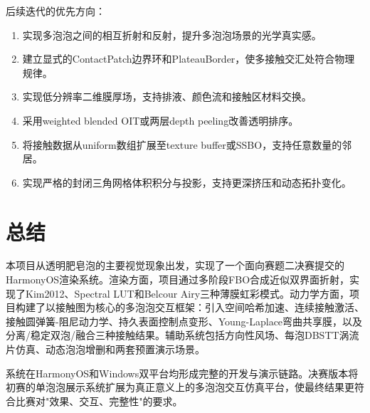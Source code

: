 后续迭代的优先方向：
\begin{enumerate}
  \item 实现多泡泡之间的相互折射和反射，提升多泡泡场景的光学真实感。
  \item 建立显式的ContactPatch边界环和PlateauBorder，使多接触交汇处符合物理规律。
  \item 实现低分辨率二维膜厚场，支持排液、颜色流和接触区材料交换。
  \item 采用weighted blended OIT或两层depth peeling改善透明排序。
  \item 将接触数据从uniform数组扩展至texture buffer或SSBO，支持任意数量的邻居。
  \item 实现严格的封闭三角网格体积积分与投影，支持更深挤压和动态拓扑变化。
\end{enumerate}

\section{总结}

本项目从透明肥皂泡的主要视觉现象出发，实现了一个面向赛题二决赛提交的HarmonyOS渲染系统。渲染方面，项目通过多阶段FBO合成近似双界面折射，实现了Kim2012、Spectral LUT和Belcour Airy三种薄膜虹彩模式。动力学方面，项目构建了以接触图为核心的多泡泡交互框架：引入空间哈希加速、连续接触激活、接触圆弹簧-阻尼动力学、持久表面控制点变形、Young-Laplace弯曲共享膜，以及分离/稳定双泡/融合三种接触结果。辅助系统包括方向性风场、每泡DBSTT涡流片仿真、动态泡泡增删和两套预置演示场景。

系统在HarmonyOS和Windows双平台均形成完整的开发与演示链路。决赛版本将初赛的单泡泡展示系统扩展为真正意义上的多泡泡交互仿真平台，使最终结果更符合比赛对"效果、交互、完整性"的要求。
